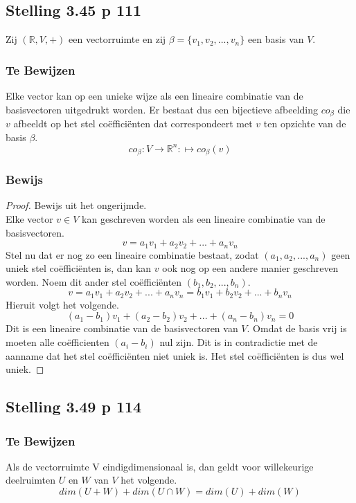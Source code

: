 \documentclass[lineaire_algebra_oplossingen.tex]{subfiles}
\begin{document}
\subsection{Stelling 3.45 p 111}
\label{3.45}
Zij $(\mathbb{R},V,+)$ een vectorruimte en zij $\beta = \{v_1,v_2,...,v_n\}$ een basis van $V$.

\subsubsection*{Te Bewijzen}
Elke vector kan op een unieke wijze als een lineaire combinatie van de basisvectoren uitgedrukt worden. Er bestaat dus een bijectieve afbeelding $co_{\beta}$ die $v$ afbeeldt op het stel co\"effici\"enten dat correspondeert met $v$ ten opzichte van de basis $\beta$.
\[
co_{\beta}: V \rightarrow \mathbb{R}^n
 : \mapsto co_{\beta}(v)\]
 
\subsubsection*{Bewijs}
\begin{proof}
Bewijs uit het ongerijmde.\\
Elke vector $v\in V$ kan geschreven worden als een lineaire combinatie van de basisvectoren.
\[
v = a_1v_1 + a_2v_2 + ... + a_nv_n
\]
Stel nu dat er nog zo een lineaire combinatie bestaat, zodat $(a_1,a_2,...,a_n)$ geen uniek stel co\"effici\"enten is, dan kan $v$ ook nog op een andere manier geschreven worden. Noem dit ander stel co\"effici\"enten $(b_1,b_2,...,b_n)$.
\[
v = a_1v_1 + a_2v_2 + ... + a_nv_n = b_1v_1 + b_2v_2 + ... + b_nv_n
\]
Hieruit volgt het volgende.
\[ 
(a_1-b_1)v_1 + (a_2-b_2)v_2 + ... + (a_n-b_n)v_n= 0
\]
Dit is een lineaire combinatie van de basisvectoren van $V$. Omdat de basis vrij is moeten alle co\"efficienten $(a_i-b_i)$ nul zijn. Dit is in contradictie met de aanname dat het stel co\"effici\"enten niet uniek is. Het stel co\"effici\"enten is dus wel uniek.
\end{proof}


\subsection{Stelling 3.49 p 114}
\label{3.49}
\subsubsection*{Te Bewijzen}
Als de vectorruimte V eindigdimensionaal is, dan geldt voor willekeurige deelruimten $U$ en $W$ van $V$ het volgende.
\[
dim(U+W) + dim(U\cap W) = dim(U) + dim(W)
\]
\end{document}
